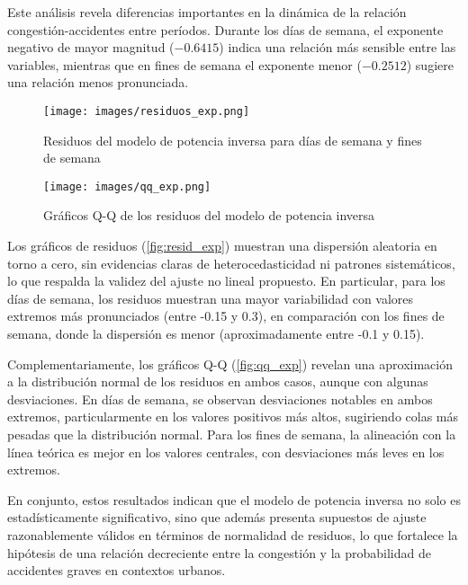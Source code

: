 \documentclass[12pt]{article}
\begin{document}
Este análisis revela diferencias importantes en la dinámica de la relación congestión-accidentes entre períodos. Durante los días de semana, el exponente negativo de mayor magnitud ($-0.6415$) indica una relación más sensible entre las variables, mientras que en fines de semana el exponente menor ($-0.2512$) sugiere una relación menos pronunciada.

\begin{figure}[H]
\centering
\texttt{[image: images/residuos\_exp.png]}
\caption{Residuos del modelo de potencia inversa para días de semana y fines de semana}
\label{fig:resid_exp}
\end{figure}

\begin{figure}[H]
\centering
\texttt{[image: images/qq\_exp.png]}
\caption{Gráficos Q-Q de los residuos del modelo de potencia inversa}
\label{fig:qq_exp}
\end{figure}

Los gráficos de residuos (\autoref{fig:resid_exp}) muestran una dispersión aleatoria en torno a cero, sin evidencias claras de heterocedasticidad ni patrones sistemáticos, lo que respalda la validez del ajuste no lineal propuesto. En particular, para los días de semana, los residuos muestran una mayor variabilidad con valores extremos más pronunciados (entre -0.15 y 0.3), en comparación con los fines de semana, donde la dispersión es menor (aproximadamente entre -0.1 y 0.15).

Complementariamente, los gráficos Q-Q (\autoref{fig:qq_exp}) revelan una aproximación a la distribución normal de los residuos en ambos casos, aunque con algunas desviaciones. En días de semana, se observan desviaciones notables en ambos extremos, particularmente en los valores positivos más altos, sugiriendo colas más pesadas que la distribución normal. Para los fines de semana, la alineación con la línea teórica es mejor en los valores centrales, con desviaciones más leves en los extremos.

En conjunto, estos resultados indican que el modelo de potencia inversa no solo es estadísticamente significativo, sino que además presenta supuestos de ajuste razonablemente válidos en términos de normalidad de residuos, lo que fortalece la hipótesis de una relación decreciente entre la congestión y la probabilidad de accidentes graves en contextos urbanos.

\end{document}
